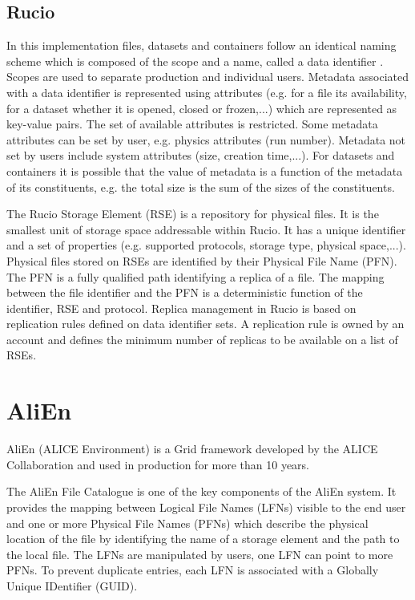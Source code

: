 \subsection{Rucio}
In this implementation files, datasets and containers follow an identical naming scheme which is composed of the
scope and a name, called a data identifier \cite{ATLAS-Rucio}. Scopes are used to separate production and individual
users. Metadata associated with a data identifier is represented using attributes (e.g. for a file its availability,
for a dataset whether it is opened, closed or frozen,...) which are represented as key-value pairs. 
The set of available attributes is restricted. Some metadata attributes can be set by user, e.g. physics 
attributes (run number). Metadata not set by users include system attributes (size, creation time,...). 
For datasets and containers it is possible that the value of metadata is a function of the metadata of its
constituents, e.g. the total size is the sum of the sizes of the constituents.

The Rucio Storage Element (RSE) is a repository for physical files. It is the smallest unit of
storage space addressable within Rucio. It has a unique identifier and a set of properties (e.g. supported 
protocols, storage type, physical space,...). Physical files stored on RSEs are identified by their Physical File 
Name (PFN).
The PFN is a fully qualified path identifying a replica of a file. The mapping between the file identifier and
the PFN is a deterministic function of the identifier, RSE and protocol. Replica management in Rucio is based on
replication rules defined on data identifier sets. A replication rule is owned by an account and defines the 
minimum number of replicas to be available on a list of RSEs.

\section{AliEn}

AliEn (ALICE Environment) \cite{AliEn2} is a Grid framework developed by the ALICE
Collaboration and used in production for more than 10 years. 

The AliEn File Catalogue is one of the key components of the AliEn system. It
provides the mapping between Logical File Names (LFNs) visible to the end user
and one or more Physical File Names (PFNs) which describe the physical location
of the file by identifying the name of a storage element and the path to the
local file. The LFNs are manipulated by users, one LFN can point to more PFNs.
To prevent duplicate entries, each LFN is associated with a Globally Unique
IDentifier (GUID).

